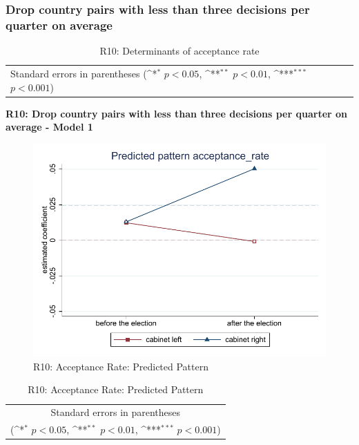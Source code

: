 \documentclass[10pt,a4paper]{scrartcl}
\begin{document}


\clearpage
\FloatBarrier
\subsubsection{Drop country pairs with less than three decisions per quarter on average}
\begin{table}[!ht]\centering
	\renewcommand{\arraystretch}{1.25}
	\small
	\def\sym#1{\ifmmode^{#1}\else\(^{#1}\)\fi}
	\caption{R10: Determinants of acceptance rate}
	\begin{tabular}{l*{3}{c}}
		\hline\hline
		
		\hline\hline
		\multicolumn{4}{l}{\footnotesize Standard errors in parentheses (\sym{*} \(p<0.05\), \sym{**} \(p<0.01\), \sym{***} \(p<0.001\))}\\
	\end{tabular}
\end{table}

\clearpage
\textbf{R10: Drop country pairs with less than three decisions per quarter on average - Model 1}
\begin{figure}[!ht]
	\centering
	\includegraphics[width=1\textwidth]{figures_edited/acceptance_rate_graph1_R10.pdf}
	\caption{R10: Acceptance Rate: Predicted Pattern}
\end{figure}

\begin{table}[!ht]\centering
	\renewcommand{\arraystretch}{1.25}
	\def\sym#1{\ifmmode^{#1}\else\(^{#1}\)\fi}
	\caption{R10: Acceptance Rate: Predicted Pattern}
	\begin{tabular}{l*{2}{c}}
		\hline\hline
		
		\hline\hline
		\multicolumn{3}{c}{\footnotesize Standard errors in parentheses} \\
		\multicolumn{3}{c}{\footnotesize (\sym{*} \(p<0.05\), \sym{**} \(p<0.01\), \sym{***} \(p<0.001\))}\\
	\end{tabular}
\end{table}
\end{document}

